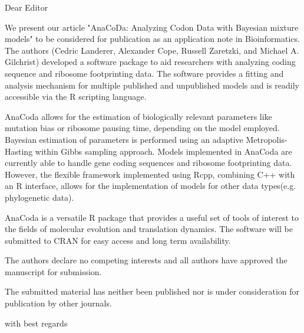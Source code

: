 \documentclass[11pt,letterpaper]{letter}
\begin{document}
 
\begin{letter}{} 
\opening{Dear Editor} 

We present our article "AnaCoDa: Analyzing Codon Data with Bayesian mixture models" to be considered for publication as an application note in Bioinformatics.
The authors (Cedric Landerer, Alexander Cope, Russell Zaretzki, and Michael A. Gilchrist) developed a software package to aid researchers with analyzing coding sequence and ribosome footprinting data. The software provides a fitting and analysis mechanism for multiple published and unpublished models and is readily accessible via the R scripting language.

AnaCoda allows for the estimation of biologically relevant parameters like mutation bias or ribosome pausing time, depending on the model employed.  Bayesian estimation of parameters is performed using an adaptive Metropolis-Hasting within Gibbs sampling approach. Models implemented in AnaCoda are currently able to handle gene coding sequences and ribosome footprinting data.  However, the flexible framework implemented using Rcpp, combining C++ with an R interface, allows for the implementation of models for other data types(e.g. phylogenetic data).

AnaCoda is a versatile R package that provides a useful set of tools of interest to the fields of molecular evolution and translation dynamics.
The software will be submitted to CRAN for easy access and long term availability.

The authors declare no competing interests and all authors have approved the manuscript for submission.

The submitted material has neither been published nor is under consideration for publication by other journals.

\closing{with best regards} 
\end{letter} 
\end{document}
